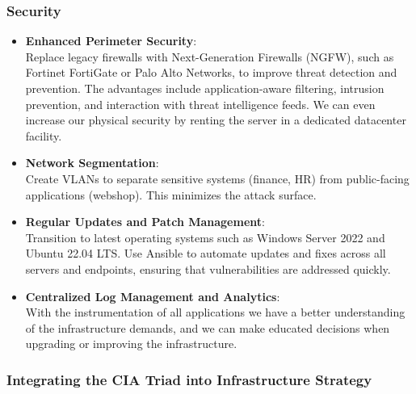 \documentclass{llncs}
\begin{document}
\subsubsection*{Security}

\begin{itemize}
  \item \textbf{Enhanced Perimeter Security}:
        \\
        Replace legacy firewalls with Next-Generation Firewalls (NGFW), such as Fortinet FortiGate or Palo Alto Networks, to improve threat detection and prevention.
        The advantages include application-aware filtering, intrusion prevention, and interaction with threat intelligence feeds.
        We can even increase our physical security by renting the server in a dedicated datacenter facility.
        \\
  \item \textbf{Network Segmentation}:
        \\ 
        Create VLANs to separate sensitive systems (finance, HR) from public-facing applications (webshop). This minimizes the attack surface.
        \\    
  \item \textbf{Regular Updates and Patch Management}:
        \\ 
        Transition to latest operating systems such as Windows Server 2022 and Ubuntu 22.04 LTS.
        Use Ansible to automate updates and fixes across all servers and endpoints, ensuring that vulnerabilities are addressed quickly.
        \\ 
  \item \textbf{Centralized Log Management and Analytics}:
        \\ 
        With the instrumentation of all applications we have a better understanding of the infrastructure demands, and we can make educated decisions when upgrading or improving the infrastructure.
        \\ 
\end{itemize}

\subsubsection*{Integrating the CIA Triad into Infrastructure Strategy}
\phantom{.}
\end{document}
